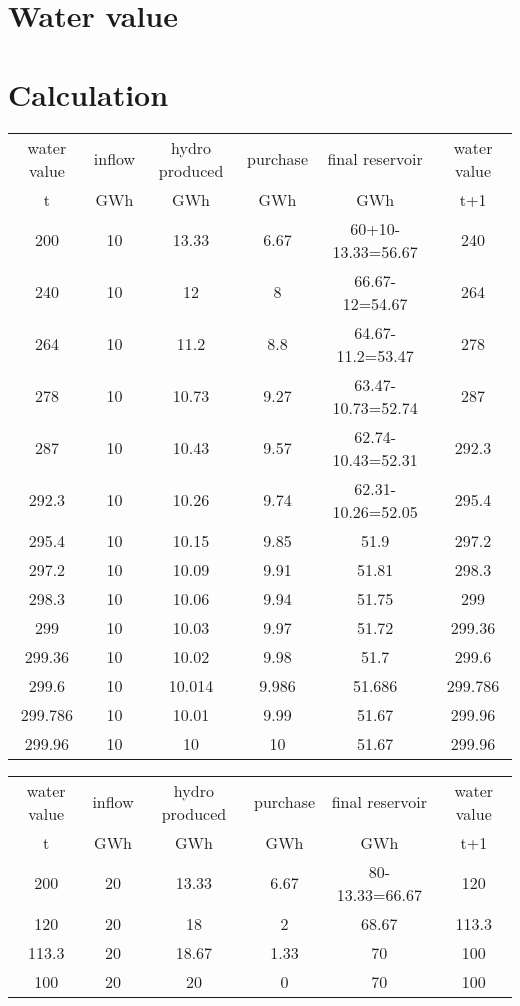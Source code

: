 \documentclass{article}
\begin{document}
\section{Water value}

\section{Calculation}
\begin{center}
\begin{tabular}{|c|c|c|c|c|c|}
\hline
water value & inflow & hydro produced & purchase & final reservoir	& water value\\
    t       &  GWh   &    GWh         &     GWh       &     GWh         & t+1 \\
\hline
\hline
200 & 10 & 13.33 & 6.67 & 60+10-13.33=56.67 & 240\\
240 & 10 & 12 & 8 & 66.67-12=54.67 & 264\\
264 & 10 & 11.2 & 8.8 & 64.67-11.2=53.47 & 278\\
278 & 10 & 10.73 & 9.27 & 63.47-10.73=52.74 & 287\\
287 & 10 & 10.43 & 9.57 & 62.74-10.43=52.31 & 292.3\\
292.3 & 10 & 10.26 & 9.74 & 62.31-10.26=52.05 & 295.4\\
295.4 & 10 & 10.15 & 9.85 & 51.9 & 297.2\\
297.2 & 10 & 10.09 & 9.91 & 51.81 & 298.3\\
298.3 & 10 & 10.06 & 9.94 & 51.75 & 299\\
299 & 10 & 10.03 & 9.97 & 51.72 & 299.36\\
299.36 & 10 & 10.02 & 9.98 & 51.7 & 299.6\\
299.6 & 10 & 10.014 & 9.986 & 51.686 & 299.786\\
299.786 & 10 & 10.01 & 9.99 & 51.67 & 299.96\\
\hline
299.96 & 10 & 10 & 10 & 51.67 & 299.96\\
\hline
\end{tabular}
\end{center}


\begin{center}
\begin{tabular}{|c|c|c|c|c|c|}
\hline
water value & inflow & hydro produced & purchase & final reservoir	& water value\\
    t       &  GWh   &    GWh         &     GWh       &     GWh         & t+1 \\
\hline
\hline
200 & 20 & 13.33 & 6.67 & 80-13.33=66.67 & 120\\
120 & 20 & 18 & 2 & 68.67 & 113.3\\
113.3 & 20 & 18.67 & 1.33 & 70 & 100\\
\hline
100 & 20 & 20 & 0 & 70 & 100\\
\hline
\end{tabular}
\end{center}
\end{document}
